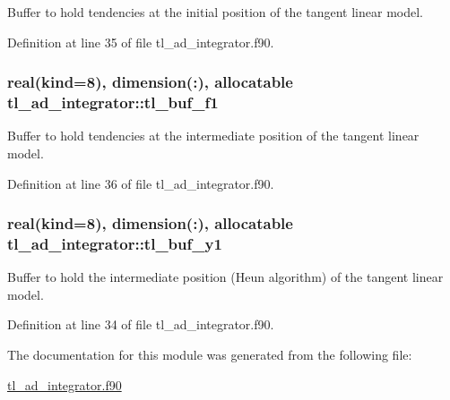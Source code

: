 Buffer to hold tendencies at the initial position of the tangent linear model. 



Definition at line 35 of file tl\-\_\-ad\-\_\-integrator.\-f90.

\hypertarget{classtl__ad__integrator_ac77cf11c6f8291b74160743e557ba1dd}{
\subsubsection[{tl\-\_\-buf\-\_\-f1}]{\setlength{\rightskip}{0pt plus 5cm}real(kind=8), dimension(\-:), allocatable tl\-\_\-ad\-\_\-integrator\-::tl\-\_\-buf\-\_\-f1\hspace{0.3cm}{\ttfamily [private]}}}\label{classtl__ad__integrator_ac77cf11c6f8291b74160743e557ba1dd}


Buffer to hold tendencies at the intermediate position of the tangent linear model. 



Definition at line 36 of file tl\-\_\-ad\-\_\-integrator.\-f90.

\hypertarget{classtl__ad__integrator_a5b09945b6da493a8256dd42eafd580ba}{
\subsubsection[{tl\-\_\-buf\-\_\-y1}]{\setlength{\rightskip}{0pt plus 5cm}real(kind=8), dimension(\-:), allocatable tl\-\_\-ad\-\_\-integrator\-::tl\-\_\-buf\-\_\-y1\hspace{0.3cm}{\ttfamily [private]}}}\label{classtl__ad__integrator_a5b09945b6da493a8256dd42eafd580ba}


Buffer to hold the intermediate position (Heun algorithm) of the tangent linear model. 



Definition at line 34 of file tl\-\_\-ad\-\_\-integrator.\-f90.



The documentation for this module was generated from the following file\-:\begin{DoxyCompactItemize}
\item 
\hyperlink{tl__ad__integrator_8f90}{tl\-\_\-ad\-\_\-integrator.\-f90}\end{DoxyCompactItemize}
